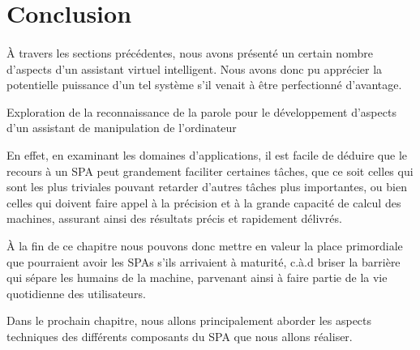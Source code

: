 \section{Conclusion}
\paragraph{}
À travers les sections précédentes, nous avons présenté un certain nombre d'aspects d'un assistant virtuel intelligent. Nous avons donc pu apprécier la potentielle puissance d'un tel système s'il venait à être perfectionné d'avantage.

Exploration de la reconnaissance de la parole pour le développement d'aspects d'un assistant de manipulation de l'ordinateur

\par En effet, en examinant les domaines d'applications, il est facile de déduire que le recours à un SPA peut grandement faciliter certaines tâches, que ce soit celles qui sont les plus triviales pouvant retarder d'autres tâches plus importantes, ou bien celles qui doivent faire appel à la précision et à la grande capacité de calcul des machines, assurant ainsi des résultats précis et rapidement délivrés.
\par
À la fin de ce chapitre nous pouvons donc mettre en valeur la place primordiale que pourraient avoir les SPAs s'ils arrivaient à maturité, c.à.d briser la barrière qui sépare les humains de la machine, parvenant ainsi à faire partie de la vie quotidienne des utilisateurs. 
\par Dans le prochain chapitre, nous allons principalement aborder les aspects techniques des différents composants du SPA que nous allons réaliser.

 
